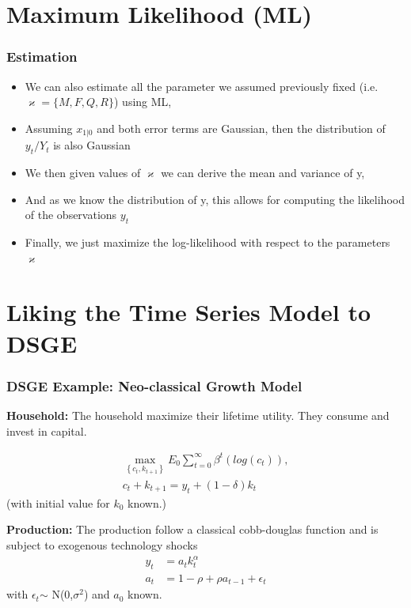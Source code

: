 \documentclass[notes=show]{beamer}%
\makeatletter
\let\beamer@writeslidentry@miniframeson=\beamer@writeslidentry
\def\beamer@writeslidentry@miniframesoff{  \expandafter\beamer@ifempty\expandafter{\beamer@framestartpage}{}  {        \clearpage\beamer@notesactions  }
}
\newcommand*{\miniframeson}
{\let\beamer@writeslidentry=\beamer@writeslidentry@miniframeson}
\newcommand*{\miniframesoff}
{\let\beamer@writeslidentry=\beamer@writeslidentry@miniframesoff}
\makeatother
\begin{document}
\miniframesoff
\section{Maximum Likelihood (ML)}

\miniframeson

\begin{frame}
\frametitle{Estimation}

\begin{itemize}
\item We can also estimate all the parameter we assumed previously fixed (i.e. $\varkappa=\{M, F, Q, R\}$) using ML,
\item Assuming $x_{1|0}$ and both error terms are Gaussian, then the distribution of $y_{t}/Y_{t}$ is also Gaussian
\item We then given values of $\varkappa$ we can derive the mean and variance of y,
\item And as we know the distribution of y, this allows for computing the likelihood of the observations $y_{t}$
\item Finally, we just maximize the log-likelihood with respect to the parameters $\varkappa$
\end{itemize}


\end{frame}

\miniframesoff
\section{Liking the Time Series Model to DSGE}

\miniframeson

\begin{frame}

\frametitle{DSGE Example: Neo-classical Growth Model}
\textbf{Household:} 
The household maximize their lifetime utility. They consume and invest in capital.

\begin{align}
\max_{\left\{  c_{t},k_{t+1}\right\}  }E_{0}\sum_{t=0}^{\infty
}\beta^{t}\left( log(c_{t})\right),\nonumber\\
c_{t}+k_{t+1}=y_{t}+(1-\delta)k_{t}
\end{align}
(with initial value for $k_{0}$ known.)

\textbf{Production:} 
The production follow a classical cobb-douglas function and is subject to exogenous technology shocks
\begin{align}
y_{t}&=a_{t}k_{t}^\alpha\\
a_{t}&=1-\rho+\rho a_{t-1}+\epsilon_{t}
\end{align}
with $\epsilon_{t}$$\sim$ N(0,$\sigma^2$) and $a_{0}$ known.


\end{frame}
\end{document}
